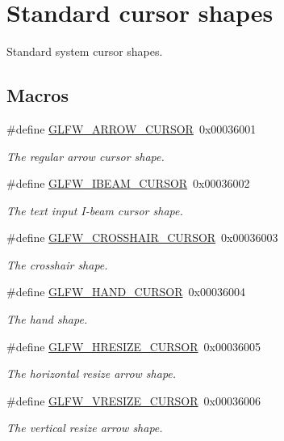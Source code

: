 \hypertarget{group__shapes}{}\section{Standard cursor shapes}
\label{group__shapes}


Standard system cursor shapes.  


\subsection*{Macros}
\begin{DoxyCompactItemize}
\item 
\#define \mbox{\hyperlink{group__shapes_ga8ab0e717245b85506cb0eaefdea39d0a}{G\+L\+F\+W\+\_\+\+A\+R\+R\+O\+W\+\_\+\+C\+U\+R\+S\+OR}}~0x00036001
\begin{DoxyCompactList}\small\item\em The regular arrow cursor shape. \end{DoxyCompactList}\item 
\#define \mbox{\hyperlink{group__shapes_ga36185f4375eaada1b04e431244774c86}{G\+L\+F\+W\+\_\+\+I\+B\+E\+A\+M\+\_\+\+C\+U\+R\+S\+OR}}~0x00036002
\begin{DoxyCompactList}\small\item\em The text input I-\/beam cursor shape. \end{DoxyCompactList}\item 
\#define \mbox{\hyperlink{group__shapes_ga8af88c0ea05ab9e8f9ac1530e8873c22}{G\+L\+F\+W\+\_\+\+C\+R\+O\+S\+S\+H\+A\+I\+R\+\_\+\+C\+U\+R\+S\+OR}}~0x00036003
\begin{DoxyCompactList}\small\item\em The crosshair shape. \end{DoxyCompactList}\item 
\#define \mbox{\hyperlink{group__shapes_ga1db35e20849e0837c82e3dc1fd797263}{G\+L\+F\+W\+\_\+\+H\+A\+N\+D\+\_\+\+C\+U\+R\+S\+OR}}~0x00036004
\begin{DoxyCompactList}\small\item\em The hand shape. \end{DoxyCompactList}\item 
\#define \mbox{\hyperlink{group__shapes_gabb3eb0109f11bb808fc34659177ca962}{G\+L\+F\+W\+\_\+\+H\+R\+E\+S\+I\+Z\+E\+\_\+\+C\+U\+R\+S\+OR}}~0x00036005
\begin{DoxyCompactList}\small\item\em The horizontal resize arrow shape. \end{DoxyCompactList}\item 
\#define \mbox{\hyperlink{group__shapes_gaf024f0e1ff8366fb2b5c260509a1fce5}{G\+L\+F\+W\+\_\+\+V\+R\+E\+S\+I\+Z\+E\+\_\+\+C\+U\+R\+S\+OR}}~0x00036006
\begin{DoxyCompactList}\small\item\em The vertical resize arrow shape. \end{DoxyCompactList}\end{DoxyCompactItemize}


